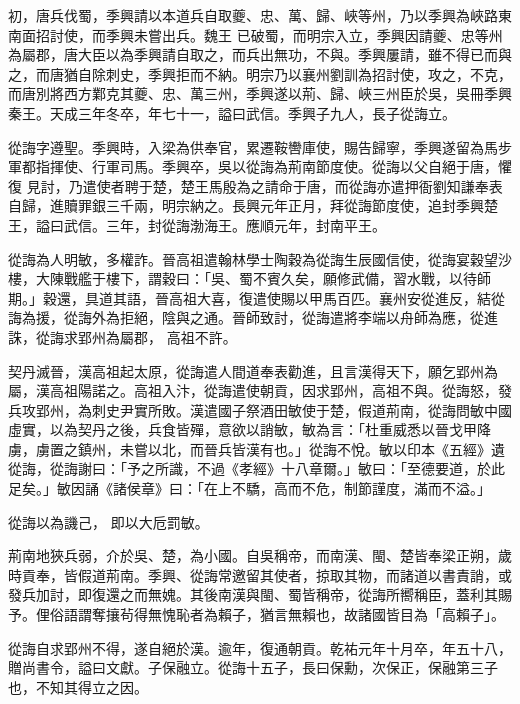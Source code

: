 \begin{pinyinscope}
 初，唐兵伐蜀，季興請以本道兵自取夔、忠、萬、歸、峽等州，乃以季興為峽路東南面招討使，而季興未嘗出兵。魏王
 已破蜀，而明宗入立，季興因請夔、忠等州為屬郡，唐大臣以為季興請自取之，而兵出無功，不與。季興屢請，雖不得已而與之，而唐猶自除刺史，季興拒而不納。明宗乃以襄州劉訓為招討使，攻之，不克，而唐別將西方鄴克其夔、忠、萬三州，季興遂以荊、歸、峽三州臣於吳，吳冊季興秦王。天成三年冬卒，年七十一，謚曰武信。季興子九人，長子從誨立。



 從誨字遵聖。季興時，入梁為供奉官，累遷鞍轡庫使，賜告歸寧，季興遂留為馬步軍都指揮使、行軍司馬。季興卒，吳以從誨為荊南節度使。從誨以父自絕于唐，懼復
 見討，乃遣使者聘于楚，楚王馬殷為之請命于唐，而從誨亦遣押衙劉知謙奉表自歸，進贖罪銀三千兩，明宗納之。長興元年正月，拜從誨節度使，追封季興楚王，謚曰武信。三年，封從誨渤海王。應順元年，封南平王。



 從誨為人明敏，多權詐。晉高祖遣翰林學士陶穀為從誨生辰國信使，從誨宴穀望沙樓，大陳戰艦于樓下，謂穀曰：「吳、蜀不賓久矣，願修武備，習水戰，以待師期。」穀還，具道其語，晉高祖大喜，復遣使賜以甲馬百匹。襄州安從進反，結從誨為援，從誨外為拒絕，陰與之通。晉師致討，從誨遣將李端以舟師為應，從進誅，從誨求郢州為屬郡，
 高祖不許。



 契丹滅晉，漢高祖起太原，從誨遣人間道奉表勸進，且言漢得天下，願乞郢州為屬，漢高祖陽諾之。高祖入汴，從誨遣使朝貢，因求郢州，高祖不與。從誨怒，發兵攻郢州，為刺史尹實所敗。漢遣國子祭酒田敏使于楚，假道荊南，從誨問敏中國虛實，以為契丹之後，兵食皆殫，意欲以誚敏，敏為言：「杜重威悉以晉戈甲降虜，虜置之鎮州，未嘗以北，而晉兵皆漢有也。」從誨不悅。敏以印本《五經》遺從誨，從誨謝曰：「予之所識，不過《孝經》十八章爾。」敏曰：「至德要道，於此足矣。」敏因誦《諸侯章》曰：「在上不驕，高而不危，制節謹度，滿而不溢。」



 從誨以為譏己，
 即以大卮罰敏。



 荊南地狹兵弱，介於吳、楚，為小國。自吳稱帝，而南漢、閩、楚皆奉梁正朔，歲時貢奉，皆假道荊南。季興、從誨常邀留其使者，掠取其物，而諸道以書責誚，或發兵加討，即復還之而無媿。其後南漢與閩、蜀皆稱帝，從誨所嚮稱臣，蓋利其賜予。俚俗語謂奪攘茍得無愧恥者為賴子，猶言無賴也，故諸國皆目為「高賴子」。



 從誨自求郢州不得，遂自絕於漢。逾年，復通朝貢。乾祐元年十月卒，年五十八，贈尚書令，謚曰文獻。子保融立。從誨十五子，長曰保勳，次保正，保融第三子也，不知其得立之因。




\end{pinyinscope}

